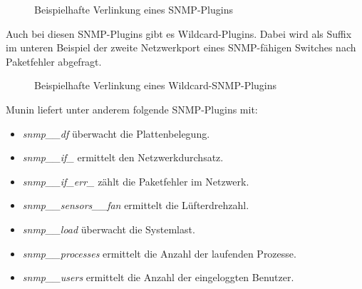 \begin{figure}[ht]
	\centering
		\caption{Beispielhafte Verlinkung eines SNMP-Plugins}
		\label{snmp-simple}
\end{figure}

Auch bei diesen SNMP-Plugins gibt es Wildcard-Plugins.
Dabei wird als Suffix im unteren Beispiel der zweite Netzwerkport eines SNMP-fähigen Switches nach Paketfehler abgefragt.

\begin{figure}[ht]
	\centering
		\caption{Beispielhafte Verlinkung eines Wildcard-SNMP-Plugins}
		\label{snmp-complex}
\end{figure}

\newpage

Munin liefert unter anderem folgende SNMP-Plugins mit:

\begin{itemize}
\item \textit{snmp\_\_df} überwacht die Plattenbelegung.
\item \textit{snmp\_\_if\_} ermittelt den Netzwerkdurchsatz.
\item \textit{snmp\_\_if\_err\_} zählt die Paketfehler im Netzwerk.
\item \textit{snmp\_\_sensors\_\_fan} ermittelt die Lüfterdrehzahl.
\item \textit{snmp\_\_load} überwacht die Systemlast.
\item \textit{snmp\_\_processes} ermittelt die Anzahl der laufenden Prozesse.
\item \textit{snmp\_\_users} ermittelt die Anzahl der eingeloggten Benutzer.
\end{itemize}